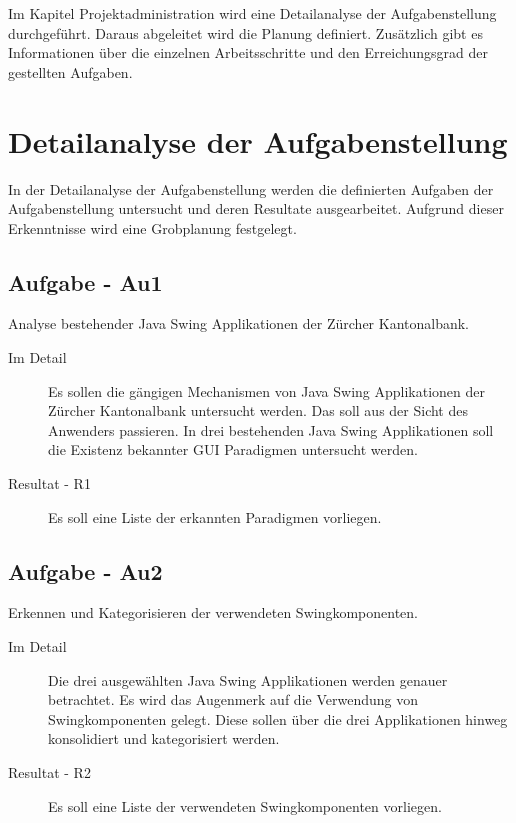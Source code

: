   Im Kapitel Projektadministration wird eine Detailanalyse der Aufgabenstellung
  durchgeführt. Daraus abgeleitet wird die Planung definiert. Zusätzlich gibt es
  Informationen über die einzelnen Arbeitsschritte und den Erreichungsgrad der
  gestellten Aufgaben.
  
  \section{Detailanalyse der Aufgabenstellung}

  In der Detailanalyse der Aufgabenstellung werden die definierten Aufgaben der
  Aufgabenstellung untersucht und deren Resultate ausgearbeitet. Aufgrund dieser
  Erkenntnisse wird eine Grobplanung festgelegt.
  
  \subsection{Aufgabe - Au1\label{itm:Aufgabe-01}}

  \begin{itshape}Analyse bestehender Java Swing Applikationen der Zürcher
  Kantonalbank.\end{itshape}
  
  \begin{description}
    \item[Im Detail\label{itm:Detail-01}]
    Es sollen die gängigen Mechanismen von Java Swing Applikationen der Zürcher
    Kantonalbank untersucht werden. Das soll aus der Sicht des Anwenders
    passieren. In drei bestehenden Java Swing Applikationen soll die Existenz
    bekannter GUI Paradigmen untersucht werden.
    \item[Resultat - R1\label{itm:Resultat-01}]
    Es soll eine Liste der erkannten Paradigmen vorliegen.
  \end{description}
  
  \subsection{Aufgabe - Au2\label{itm:Aufgabe-02}}

  \begin{itshape}Erkennen und Kategorisieren der verwendeten
  Swingkomponenten.\end{itshape}

  \begin{description}
    \item[Im Detail\label{itm:Detail-02}]
    Die drei ausgewählten Java Swing Applikationen werden genauer betrachtet.
    Es wird das Augenmerk auf die Verwendung von Swingkomponenten gelegt. Diese
    sollen über die drei Applikationen hinweg konsolidiert und kategorisiert
    werden.
    \item[Resultat - R2\label{itm:Resultat-02}]
    Es soll eine Liste der verwendeten Swingkomponenten vorliegen.
  \end{description}
  

